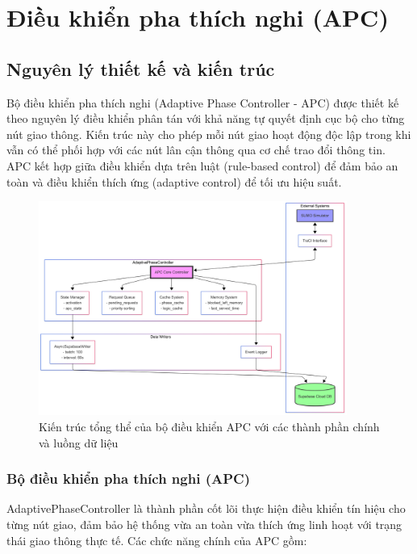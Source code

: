 \chapter{Điều khiển pha thích nghi (APC)}

\section{Nguyên lý thiết kế và kiến trúc}

Bộ điều khiển pha thích nghi (Adaptive Phase Controller - APC) được thiết kế theo nguyên lý điều khiển phân tán với khả năng tự quyết định cục bộ cho từng nút giao thông. Kiến trúc này cho phép mỗi nút giao hoạt động độc lập trong khi vẫn có thể phối hợp với các nút lân cận thông qua cơ chế trao đổi thông tin. APC kết hợp giữa điều khiển dựa trên luật (rule-based control) để đảm bảo an toàn và điều khiển thích ứng (adaptive control) để tối ưu hiệu suất.

\begin{figure}[H]
    \centering
    \includegraphics[width=0.9\textwidth]{Untitled diagram _ Mermaid Chart-2025-08-21-074754.png}
    \caption{Kiến trúc tổng thể của bộ điều khiển APC với các thành phần chính và luồng dữ liệu}
    \label{fig:apc_architecture}
\end{figure}
\subsection{Bộ điều khiển pha thích nghi (APC)}

AdaptivePhaseController là thành phần cốt lõi thực hiện điều khiển tín hiệu cho từng nút giao, đảm bảo hệ thống vừa an toàn vừa thích ứng linh hoạt với trạng thái giao thông thực tế. Các chức năng chính của APC gồm:

